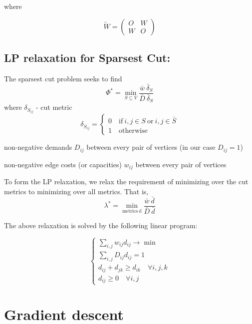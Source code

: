 \documentclass[12pt]{article}
\begin{document}
where

\[
\tilde W = \begin{pmatrix} O & W \\ W & O\end{pmatrix}
\]

\subsection{LP relaxation for Sparsest Cut:}

The sparsest cut problem seeks to find
\begin{equation}
    \Phi^*= \min\limits_{S \subseteq V} \frac{\bar{w} \ \bar{\delta}_S} {\bar{D} \ \bar{\delta}_S} 
\end{equation}
where $\delta_{S_{ij}}$ - cut metric
\begin{equation}
    \delta_{S_{ij}} = 
    \begin{cases}
        0 \quad \text{if} \ i, j \in S \ \text{or} \ i,j \in \bar{S}\\
        1 \quad \text{otherwise}
    \end{cases}
\end{equation}

non-negative demands $D_{ij}$ between every pair of vertices (in our case $D_{ij} = 1$)

non-negative edge costs (or capacities) $w_{ij}$ between every pair of vertices


To form the LP relaxation, we relax the requirement of minimizing over the cut metrics to minimizing
over all metrics. That is,
\begin{equation}
    \lambda^*= \min\limits_{\mathrm{metrics} \ \mathrm{d}} \frac{\bar{w} \ \bar{d}} {\bar{D} \ \bar{d}} 
\end{equation}

The above relaxation is solved by the following linear program:

\begin{equation}
    \begin{cases}
     \sum\limits_{i,j} w_{ij} d_{ij} \longrightarrow \min \\
	\sum\limits_{i,j} D_{ij} d_{ij} = 1\\
	d_{ij} + d_{jk} \ge d_{ik} \quad \forall i,j,k\\
	d_{ij} \ge 0 \quad \forall i,j
    \end{cases}
\end{equation}

\section{Gradient descent}
\end{document}
